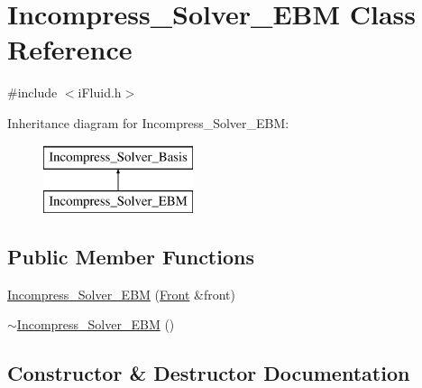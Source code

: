 \hypertarget{class_incompress___solver___e_b_m}{}\section{Incompress\+\_\+\+Solver\+\_\+\+E\+BM Class Reference}
\label{class_incompress___solver___e_b_m}


{\ttfamily \#include $<$i\+Fluid.\+h$>$}

Inheritance diagram for Incompress\+\_\+\+Solver\+\_\+\+E\+BM\+:\begin{figure}[H]
\begin{center}
\leavevmode
\includegraphics[height=2.000000cm]{d7/dfd/class_incompress___solver___e_b_m}
\end{center}
\end{figure}
\subsection*{Public Member Functions}
\begin{DoxyCompactItemize}
\item 
\hyperlink{class_incompress___solver___e_b_m_a50f17ab7c7503ac95dab914e9a9776eb}{Incompress\+\_\+\+Solver\+\_\+\+E\+BM} (\hyperlink{fdecs_8h_ac32202b798f848095c489cfd04c4ca5f}{Front} \&front)
\item 
\hyperlink{class_incompress___solver___e_b_m_a047ec85c84cb6d2ba701a3f2dad718e9}{$\sim$\+Incompress\+\_\+\+Solver\+\_\+\+E\+BM} ()
\end{DoxyCompactItemize}


\subsection{Constructor \& Destructor Documentation}
